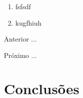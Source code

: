 \begin{enumerate}[label=\Roman{*}, ref=(\roman{*})]
  \item fsfsdf
  \item kugfhiuh
\end{enumerate}

\begin{asparaenum}
\item Anterior ... \cite{ninguem2022curioso}
\item Próximo ... \label{pl1}
\end{asparaenum}





\section{Conclusões}



